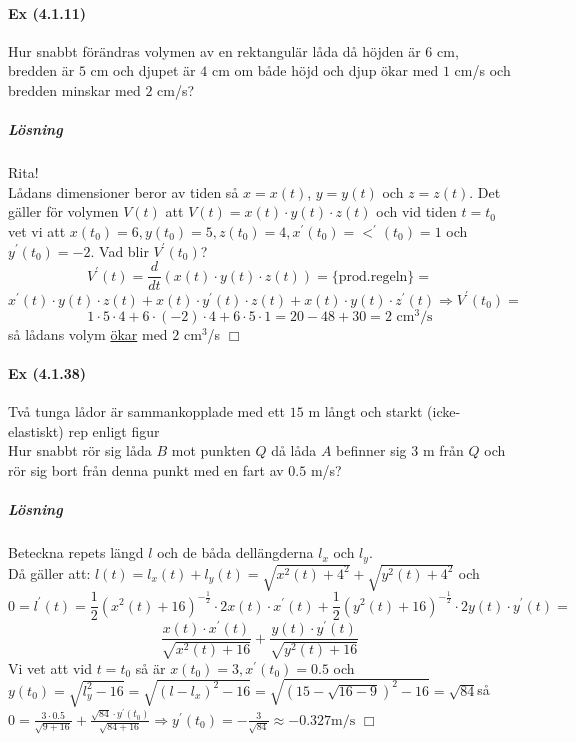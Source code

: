 \paragraph{Ex (4.1.11)} Hur snabbt förändras volymen av en rektangulär
låda då höjden är $6$ cm, bredden är $5$ cm och djupet är $4$ cm om både
höjd och djup ökar med $1$ cm/s och bredden minskar med $2$ cm/s?
\subparagraph{Lösning} Rita!\\
Lådans dimensioner beror av tiden så $x=x(t)$, $y=y(t)$ och $z=z(t)$.
Det gäller för volymen $V(t)$ att $V(t)=x(t)\cdot y(t)\cdot z(t)$
och vid tiden $t=t_0$ vet vi att $x(t_0)=6,y(t_0)=5,z(t_0)=4,x^\prime(t_0)=<^\prime(t_0)=1$ och $y^\prime(t_0)=-2$.
Vad blir $V^\prime(t_0)$?
\begin{equation*}
    V^\prime(t)=\frac{d}{dt}(x(t)\cdot y(t)\cdot z(t))=
    \{\text{prod.regeln}\}=
\end{equation*}
\begin{equation*}
    x^\prime(t)\cdot y(t)\cdot z(t) + x(t)\cdot y^\prime(t)\cdot z(t) + x(t)\cdot y(t)\cdot z^\prime(t)
    \Rightarrow V^\prime(t_0)=
\end{equation*}
\begin{equation*}
    1\cdot 5\cdot 4 + 6\cdot (-2)\cdot 4 + 6\cdot 5 \cdot 1=
    20-48+30=2\text{ cm}^3\text{/s}
\end{equation*}
så lådans volym \underline{ökar} med $2$ cm$^3$/s $\Box$

\paragraph{Ex (4.1.38)} Två tunga lådor är sammankopplade med ett $15$ m långt och starkt (icke-elastiskt) rep enligt figur\\
Hur snabbt rör sig låda $B$ mot punkten $Q$ då låda $A$ befinner sig $3$ m
från $Q$ och rör sig bort från denna punkt med en fart av $0.5$ m/s?
\subparagraph{Lösning}
Beteckna repets längd $l$ och de båda dellängderna $l_x$ och $l_y$.\\
Då gäller att:
$l(t)=l_x(t)+l_y(t)=\sqrt{x^2(t)+4^2}+\sqrt{y^2(t)+4^2}$ och
\begin{equation*}
    0=l^\prime(t)=\frac{1}{2}(x^2(t)+16)^{-\frac{1}{2}}\cdot 2x(t)\cdot x^\prime(t)+\frac{1}{2}(y^2(t)+16)^{-\frac{1}{2}}\cdot 2y(t)\cdot y^\prime(t)=
\end{equation*}
\begin{equation*}
    \frac{x(t)\cdot x^\prime(t)}{\sqrt{x^2(t)+16}}+\frac{y(t)\cdot y^\prime(t)}{\sqrt{y^2(t)+16}}
\end{equation*}
Vi vet att vid $t=t_0$ så är $x(t_0)=3,x^\prime(t_0)=0.5$ och \\
$y(t_0)=\sqrt{l_y^2-16}=\sqrt{(l-l_x)^2-16}=\sqrt{(15-\sqrt{16-9})^2-16}=\sqrt{84}$så \\
$0=\frac{3\cdot 0.5}{\sqrt{9+16}}+\frac{\sqrt{84}\cdot y^\prime(t_0)}{\sqrt{84+16}}\Rightarrow y^\prime(t_0)=-\frac{3}{\sqrt{84}}\approx -0.327\text{m/s }\Box$

